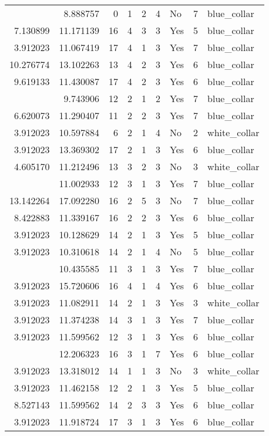 \documentclass[
]{article}
\begin{document}
\begin{longtable}[t]{rrrrrllrl}
\addlinespace
5.010635 & 8.888757 & 0 & 1 & 2 & 4 & No & 7 & blue\_collar\\
7.130899 & 11.171139 & 16 & 4 & 3 & 3 & Yes & 5 & blue\_collar\\
3.912023 & 11.067419 & 17 & 4 & 1 & 3 & Yes & 7 & blue\_collar\\
10.276774 & 13.102263 & 13 & 4 & 2 & 3 & Yes & 6 & blue\_collar\\
9.619133 & 11.430087 & 17 & 4 & 2 & 3 & Yes & 6 & blue\_collar\\
\addlinespace
3.912023 & 9.743906 & 12 & 2 & 1 & 2 & Yes & 7 & blue\_collar\\
6.620073 & 11.290407 & 11 & 2 & 2 & 3 & Yes & 7 & blue\_collar\\
3.912023 & 10.597884 & 6 & 2 & 1 & 4 & No & 2 & white\_collar\\
3.912023 & 13.369302 & 17 & 2 & 1 & 3 & Yes & 6 & blue\_collar\\
4.605170 & 11.212496 & 13 & 3 & 2 & 3 & No & 3 & white\_collar\\
\addlinespace
3.912023 & 11.002933 & 12 & 3 & 1 & 3 & Yes & 7 & blue\_collar\\
13.142264 & 17.092280 & 16 & 2 & 5 & 3 & No & 7 & blue\_collar\\
8.422883 & 11.339167 & 16 & 2 & 2 & 3 & Yes & 6 & blue\_collar\\
3.912023 & 10.128629 & 14 & 2 & 1 & 3 & Yes & 5 & blue\_collar\\
3.912023 & 10.310618 & 14 & 2 & 1 & 4 & No & 5 & blue\_collar\\
\addlinespace
3.912023 & 10.435585 & 11 & 3 & 1 & 3 & Yes & 7 & blue\_collar\\
3.912023 & 15.720606 & 16 & 4 & 1 & 4 & Yes & 6 & blue\_collar\\
3.912023 & 11.082911 & 14 & 2 & 1 & 3 & Yes & 3 & white\_collar\\
3.912023 & 11.374238 & 14 & 3 & 1 & 3 & Yes & 7 & blue\_collar\\
3.912023 & 11.599562 & 12 & 3 & 1 & 3 & Yes & 6 & blue\_collar\\
\addlinespace
3.912023 & 12.206323 & 16 & 3 & 1 & 7 & Yes & 6 & blue\_collar\\
3.912023 & 13.318012 & 14 & 1 & 1 & 3 & No & 3 & white\_collar\\
3.912023 & 11.462158 & 12 & 2 & 1 & 3 & Yes & 5 & blue\_collar\\
8.527143 & 11.599562 & 14 & 2 & 3 & 3 & Yes & 6 & blue\_collar\\
3.912023 & 11.918724 & 17 & 3 & 1 & 3 & Yes & 6 & blue\_collar\\

\end{longtable}
\end{document}
